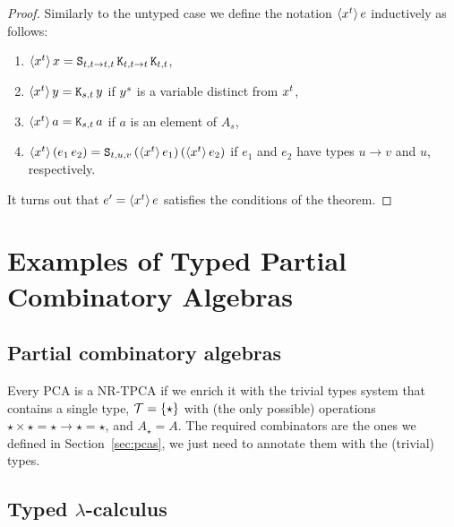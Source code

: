 \begin{proof}
  Similarly to the untyped case we define the notation
  $\langle x^{t} \rangle\,e$ inductively as follows:
  \begin{enumerate}
  \item $\langle x^{t} \rangle\,x = \mathtt{S}_{t,t \to t,t} \, \mathtt{K}_{t,t \to
      t} \, \mathtt{K}_{t,t}$,
  \item $\langle x^{t} \rangle\,y = \mathtt{K}_{s,t}\, y$ if $y^{s}$ is a
    variable distinct from $x^{t}$,
  \item $\langle x^{t} \rangle\,a = \mathtt{K}_{s,t} \, a$ if $a$ is an element
    of $A_s$,
  \item $\langle x^{t} \rangle\,(e_1\, e_2) = \mathtt{S}_{t,u,v}\,
    (\langle x^{t} \rangle\,e_1) \, (\langle x^{t} \rangle\,e_2)$ if $e_1$ and
    $e_2$ have types $u \to v$ and $u$, respectively.
  \end{enumerate}
  It turns out that $e' = \langle x^{t} \rangle\,e$ satisfies the conditions
  of the theorem.
\end{proof}

\section{Examples of Typed Partial Combinatory Algebras}
\label{sec:examples-tpcas}

\subsection{Partial combinatory algebras}

Every PCA is a NR-TPCA if we enrich it with the trivial types system
that contains a single type, $\mathcal{T} = \{\star\}$ with (the
only possible) operations $\star \times \star = \star \to \star =
\star$, and $A_\star = A$. The required combinators are the ones we
defined in Section~\ref{sec:pcas}, we just need to annotate them with
the (trivial) types.


\subsection{Typed $\lambda$-calculus}
\label{sec:typed-lambda-calculus}

